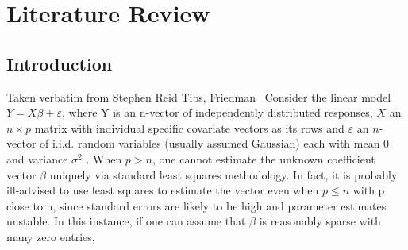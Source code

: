 \chapter{Literature Review\label{ch:litreview}}

\section{Introduction}
Taken verbatim from Stephen Reid Tibs, Friedman~\cite{reid2016study}
Consider the linear model
$Y = X\beta + \varepsilon$,
where Y is an n-vector of independently distributed responses, $X$ an $n \times p$ matrix
with individual specific covariate vectors as its rows and $\varepsilon$ an $n$-vector of
i.i.d. random variables (usually assumed Gaussian) each with mean 0 and variance $\sigma^2$
.
When $p > n$, one cannot estimate the unknown coefficient vector $\beta$ uniquely
via standard least squares methodology. In fact, it is probably ill-advised to use
least squares to estimate the vector even when $p \leq n$ with p close to n, since
standard errors are likely to be high and parameter estimates unstable. In this
instance, if one can assume that $\beta$ is reasonably sparse with many zero entries,